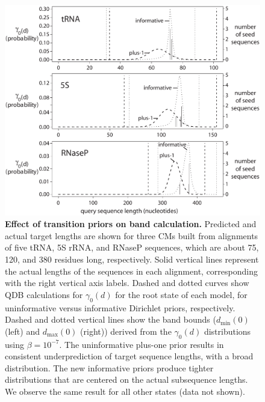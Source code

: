 \begin{figure}
  \begin{center}
    \includegraphics[width=6in,angle=0]{figs/bands}
    \caption{\textbf{Effect of transition priors on band calculation.}
      Predicted and actual target lengths are shown for three CMs
      built from alignments of five tRNA, 5S rRNA, and RNaseP
      sequences, which are about 75, 120, and 380 residues long,
      respectively.  Solid vertical lines represent the actual lengths
      of the sequences in each alignment, corresponding with the right
      vertical axis labels. Dashed and dotted curves show QDB
      calculations for $\gamma_0(d)$ for the root state of each model,
      for uninformative versus informative Dirichlet priors,
      respectively.  Dashed and dotted vertical lines show the band
      bounds ($d_{\mbox{min}}(0)$ (left) and $d_{\mbox{max}}(0)$
      (right)) derived from the $\gamma_0(d)$ distributions using
      $\beta = 10^{-7}$. The uninformative plus-one prior results in
      consistent underprediction of target sequence lengths, with a
      broad distribution. The new informative priors produce tighter
      distributions that are centered on the actual subsequence
      lengths. We observe the same result for all other states
      (data not shown).}
    \label{fig:bands}
  \end{center}
\end{figure}

